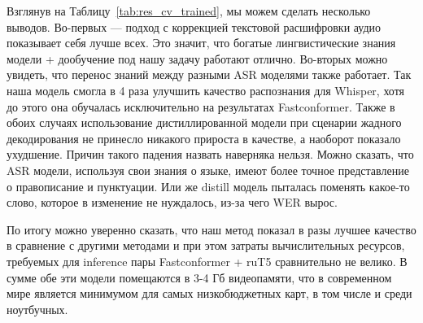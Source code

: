 Взглянув на Таблицу~\ref{tab:res_cv_trained}, мы можем сделать несколько выводов.
Во-первых — подход с коррекцией текстовой расшифровки аудио показывает себя лучше всех.
Это значит, что богатые лингвистические знания модели + дообучение под нашу задачу работают отлично.
Во-вторых можно увидеть, что перенос знаний между разными ASR моделями также работает.
Так наша модель смогла в 4 раза улучшить качество распознания для Whisper, хотя до этого она обучалась исключительно на результатах Fastconformer.
Также в обоих случаях использование дистиллированной модели при сценарии жадного декодирования не принесло никакого прироста в качестве, а наоборот показало ухудшение. Причин такого падения назвать наверняка нельзя.
Можно сказать, что ASR модели, используя свои знания о языке, имеют более точное представление о правописание и пунктуации.
Или же distill модель пыталась поменять какое-то слово, которое в изменение не нуждалось, из-за чего WER вырос.

По итогу можно уверенно сказать, что наш метод показал в разы лучшее качество в сравнение с другими методами и при этом затраты вычислительных ресурсов, требуемых для inference пары Fastconformer + ruT5 сравнительно не велико.
В сумме обе эти модели помещаются в 3-4 Гб видеопамяти, что в современном мире является минимумом для самых низкобюджетных карт, в том числе и среди ноутбучных.




